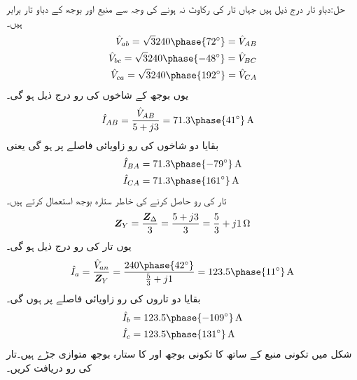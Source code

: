 حل:دباو تار درج ذیل ہیں جہاں تار کی رکاوٹ نہ ہونے کی وجہ سے منبع اور بوجھ کے دباو تار برابر ہیں۔
\begin{align*}
\hat{V}_{ab}=\sqrt{3}240\phase{72^{\circ}}=\hat{V}_{AB}\\
\hat{V}_{bc}=\sqrt{3}240\phase{-48^{\circ}}=\hat{V}_{BC}\\
\hat{V}_{ca}=\sqrt{3}240\phase{192^{\circ}}=\hat{V}_{CA}
\end{align*}
یوں بوجھ کے شاخوں کی رو درج ذیل ہو گی۔
\begin{align*}
\hat{I}_{AB}&=\frac{\hat{V}_{AB}}{5+j3}=71.3\phase{41^{\circ}}\,\si{\ampere}
\end{align*}
بقایا دو شاخوں کی رو  زاویائی فاصلے پر ہو گی یعنی
\begin{align*}
\hat{I}_{BA}&=71.3\phase{-79^{\circ}}\,\si{\ampere}\\
\hat{I}_{CA}&=71.3\phase{161^{\circ}}\,\si{\ampere}
\end{align*}
تار کی رو حاصل کرنے کی خاطر ستارہ بوجھ استعمال کرتے ہیں۔
\begin{align*}
{\ensuremath{{\boldsymbol{Z}}}}_{Y}=\frac{{{\boldsymbol{Z}}}_{\Delta}}{3}=\frac{5+j3}{3}=\frac{5}{3}+j1\,\si{\ohm}
\end{align*}
یوں تار کی رو درج ذیل ہو گی۔
\begin{align*}
\hat{I}_a=\frac{\hat{V}_{an}}{\bZ_{Y}}=\frac{240\phase{42^{\circ}}}{\frac{5}{3}+j1}=123.5\phase{11^{\circ}}\,\si{\ampere}
\end{align*}
بقایا دو تاروں کی رو  زاویائی فاصلے پر ہوں گی۔
\begin{align*}
\hat{I}_b&=123.5\phase{-109^{\circ}}\,\si{\ampere}\\
\hat{I}_c&=123.5\phase{131^{\circ}}\,\si{\ampere}\\
\end{align*}
شکل  میں تکونی منبع کے ساتھ  کا تکونی بوجھ اور  کا ستارہ بوجھ متوازی جڑے ہیں۔تار کی رو دریافت کریں۔

